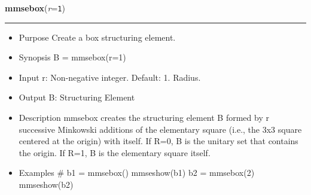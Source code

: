     \begin{boxedminipage}{\textwidth}

    \raggedright \textbf{mmsebox}(\textit{r}=\texttt{1\-})

    \vspace{-1.5ex}

    \rule{\textwidth}{0.5\fboxrule}
    \begin{itemize}
    \setlength{\parskip}{0.6ex}
      \item Purpose Create a box structuring element.

      \item Synopsis B = mmsebox(r=1)

      \item Input r: Non-negative integer. Default: 1. Radius.

      \item Output B: Structuring Element

      \item Description mmsebox creates the structuring element B formed by r 
        successive Minkowski additions of the elementary square (i.e., 
        the 3x3 square centered at the origin) with itself. If R=0, B is 
        the unitary set that contains the origin. If R=1, B is the 
        elementary square itself.

      \item Examples \# b1 = mmsebox() mmseshow(b1) b2 = mmsebox(2) 
        mmseshow(b2)

    \end{itemize}

    \vspace{1ex}

    \end{boxedminipage}

    \label{multireg:num_pymorph:mmsecross}
    \vspace{0.5ex}


